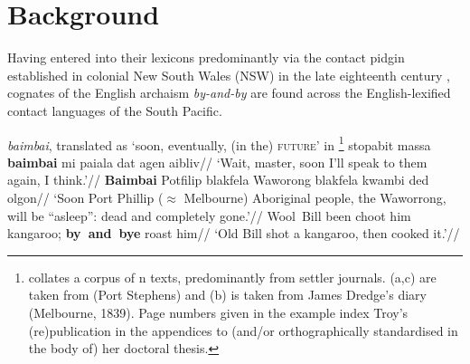 \section{Background}\label{bambai.intro}

Having entered into their lexicons predominantly via the contact pidgin established in colonial New South Wales (NSW) in the late eighteenth century \citep{Troy1994}, cognates of the English archaism \textit{by-and-by} are found across the English-lexified contact languages of the South Pacific. 


\pex[aboveglftskip=0ex] \textit{baimbai}, translated as `soon, eventually, (in the) \textsc{future}' in \citet{Troy1994}\footnote{\citet{Troy1994} collates a corpus of n texts, predominantly from settler journals. (a,c) are taken from \citet{Dawson1831} (Port Stephens) and (b) is taken from James Dredge's diary (Melbourne, 1839). Page numbers given in the example index Troy's (re)publication in the appendices to (and/or orthographically standardised in the body of) her doctoral thesis.}
\a\begingl\gla stopabit massa \textbf{baimbai} mi paiala dat agen aibliv//
\glft`Wait, master, soon I'll speak to them again, I think.'//\endgl
\a\begingl\gla \textbf{Baimbai} Potfilip blakfela Waworong blakfela kwambi ded olgon//
\glft`Soon Port Phillip ($ \approx $ Melbourne) Aboriginal people, the Waworrong, will be ``asleep'': dead and completely gone.'//\endgl
\a\begingl\gla Wool~Bill been choot him kangaroo; \textbf{by~and~bye} roast him//
\glft`Old Bill shot a kangaroo, then cooked it.'//\endgl
\xe
{}

